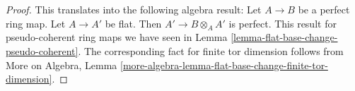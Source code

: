\documentclass[10pt,a4paper]{amsart}
\theoremstyle{plain}
\theoremstyle{definition}
\theoremstyle{remark}
\numberwithin{equation}{subsection}
\begin{document}
\begin{proof}
This translates into the following algebra result:
Let $A \to B$ be a perfect ring map.
Let $A \to A'$ be flat. Then $A' \to B \otimes_A A'$ is
perfect. This result for pseudo-coherent ring maps we have seen in
Lemma \ref{lemma-flat-base-change-pseudo-coherent}.
The corresponding fact for finite tor dimension follows from
More on Algebra,
Lemma \ref{more-algebra-lemma-flat-base-change-finite-tor-dimension}.
\end{proof}
\end{document}
